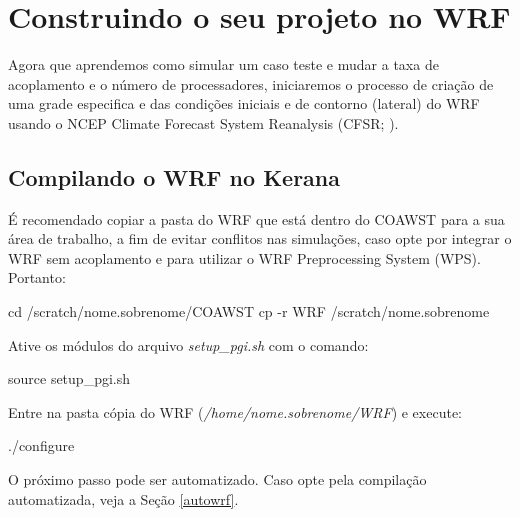 \chapter{Construindo o seu projeto no WRF}

\noindent Agora que aprendemos como simular um caso teste e mudar a taxa de acoplamento e o número de processadores, iniciaremos o processo de criação de uma grade especifica e das condições iniciais e de contorno (lateral) do WRF usando o NCEP Climate Forecast System Reanalysis (CFSR; \cite{Saha2006}).
\bigskip

\section{Compilando o WRF no Kerana}
\bigskip
\noindent É recomendado copiar a pasta do WRF que está dentro do COAWST para a sua área de trabalho, a fim de evitar conflitos nas simulações, caso opte por integrar o WRF sem acoplamento e para utilizar o WRF Preprocessing System (WPS). Portanto:
\bigskip

\begin{bashcode}
cd /scratch/nome.sobrenome/COAWST
cp -r WRF /scratch/nome.sobrenome
\end{bashcode}
\bigskip

\noindent Ative os módulos do arquivo \textit{setup\_pgi.sh} com o comando:
\bigskip
\begin{bashcode}
source setup_pgi.sh
\end{bashcode}
\bigskip

\noindent Entre na pasta cópia do WRF (\textit{/home/nome.sobrenome/WRF}) e execute:
\bigskip

\begin{bashcode}
./configure
\end{bashcode}
\bigskip

\begin{tcolorbox}[enhanced,
  grow to left by=0cm,%
  grow to right by=0cm,%
  enlarge top by=0cm,%
  enlarge bottom by=0cm,%
  tcbox raise base,
  boxrule=1.0pt,
  left=18mm,
  colframe=red!50!black,coltext=red!25!black,colback=red!10!white,
  overlay={\begin{tcbclipinterior}\fill[red!75!blue!50!white] (frame.south west)
    rectangle node[text=white,font=\sffamily\bfseries\footnotesize,rotate=0] {ATENÇÃO} ([xshift=18mm]frame.north west);\end{tcbclipinterior}}]
O próximo passo pode ser automatizado. Caso opte pela compilação automatizada, veja a Seção \textcolor{bleu_cite}{\ref{autowrf}}.
\end{tcolorbox}
\bigskip

